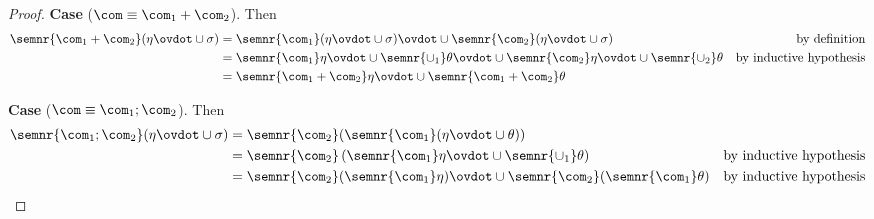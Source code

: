 \begin{proof}


  \medskip 

  \noindent
  \textbf{Case}  (\(\com \equiv \com_1 + \com_2\)).
  Then
  \begin{align*}
    \semnr{\com_1 + \com_2}(\eta \ovdot\cup \sigma) & = \semnr{\com_1}(\eta \ovdot\cup \sigma) \ovdot\cup \semnr{\com_2}(\eta \ovdot\cup \sigma) & \text{by definition}\\
                                                & = \semnr{\com_1}\eta \ovdot\cup \semnr{\cup_1}\theta \ovdot\cup \semnr{\com_2}\eta \ovdot\cup \semnr{\cup_2}\theta & \text{by inductive hypothesis} \\
                                                & = \semnr{\com_1 + \com_2}\eta \ovdot\cup \semnr{\com_1 + \com_2}\theta
  \end{align*}

  \medskip

  \noindent
  \textbf{Case}  (\(\com \equiv \com_1 ; \com_2\)).
  Then
  \begin{align*}
    \semnr{\com_1 ; \com_2}(\eta \ovdot\cup \sigma) & = \semnr{\com_2}(\semnr{\com_1}(\eta \ovdot\cup \theta)) \\
                                                & = \semnr{\com_2}\left(\semnr{\com_1}\eta \ovdot\cup \semnr{\cup_1}\theta\right) & \text{by inductive hypothesis} \\
                                                & = \semnr{\com_2}(\semnr{\com_1}\eta) \ovdot\cup \semnr{\com_2}(\semnr{\com_1}\theta) & \text{by inductive hypothesis}
  \end{align*}

  \medskip


\end{proof}
